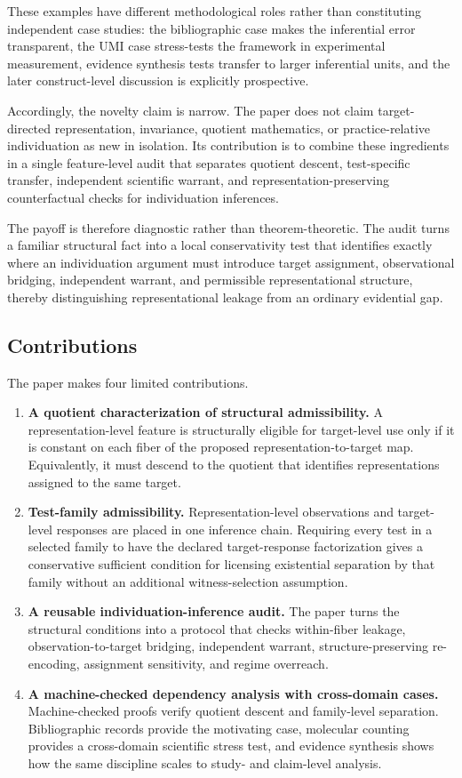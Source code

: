 \documentclass[11pt]{article}
\begin{document}
These examples have different methodological roles rather than constituting independent case studies: the bibliographic case makes the inferential error transparent, the UMI case stress-tests the framework in experimental measurement, evidence synthesis tests transfer to larger inferential units, and the later construct-level discussion is explicitly prospective.

Accordingly, the novelty claim is narrow. The paper does not claim target-directed representation, invariance, quotient mathematics, or practice-relative individuation as new in isolation. Its contribution is to combine these ingredients in a single feature-level audit that separates quotient descent, test-specific transfer, independent scientific warrant, and representation-preserving counterfactual checks for individuation inferences.

The payoff is therefore diagnostic rather than theorem-theoretic. The audit turns a familiar structural fact into a local conservativity test that identifies exactly where an individuation argument must introduce target assignment, observational bridging, independent warrant, and permissible representational structure, thereby distinguishing representational leakage from an ordinary evidential gap.

\subsection{Contributions}

The paper makes four limited contributions.

\begin{enumerate}[leftmargin=*]
\item \textbf{A quotient characterization of structural admissibility.} A representation-level feature is structurally eligible for target-level use only if it is constant on each fiber of the proposed representation-to-target map. Equivalently, it must descend to the quotient that identifies representations assigned to the same target.
\item \textbf{Test-family admissibility.} Representation-level observations and target-level responses are placed in one inference chain. Requiring every test in a selected family to have the declared target-response factorization gives a conservative sufficient condition for licensing existential separation by that family without an additional witness-selection assumption.
\item \textbf{A reusable individuation-inference audit.} The paper turns the structural conditions into a protocol that checks within-fiber leakage, observation-to-target bridging, independent warrant, structure-preserving re-encoding, assignment sensitivity, and regime overreach.
\item \textbf{A machine-checked dependency analysis with cross-domain cases.} Machine-checked proofs verify quotient descent and family-level separation. Bibliographic records provide the motivating case, molecular counting provides a cross-domain scientific stress test, and evidence synthesis shows how the same discipline scales to study- and claim-level analysis.
\end{enumerate}
\end{document}
